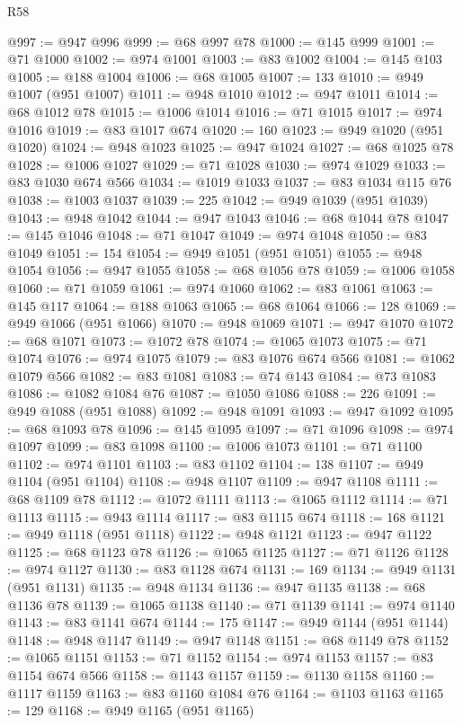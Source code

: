 \begin{lexlean}{R58}
\begin{coremodule}
{{@997 := @947 @996
@999 := @68 @997 @78
@1000 := @145 @999
@1001 := @71 @1000
@1002 := @974 @1001
@1003 := @83 @1002
@1004 := @145 @103
@1005 := @188 @1004
@1006 := @68 @1005
@1007 := 133
@1010 := @949 @1007 (@951 @1007)
@1011 := @948 @1010
@1012 := @947 @1011
@1014 := @68 @1012 @78
@1015 := @1006 @1014
@1016 := @71 @1015
@1017 := @974 @1016
@1019 := @83 @1017 @674
@1020 := 160
@1023 := @949 @1020 (@951 @1020)
@1024 := @948 @1023
@1025 := @947 @1024
@1027 := @68 @1025 @78
@1028 := @1006 @1027
@1029 := @71 @1028
@1030 := @974 @1029
@1033 := @83 @1030 @674 @566
@1034 := @1019 @1033
@1037 := @83 @1034 @115 @76
@1038 := @1003 @1037
@1039 := 225
@1042 := @949 @1039 (@951 @1039)
@1043 := @948 @1042
@1044 := @947 @1043
@1046 := @68 @1044 @78
@1047 := @145 @1046
@1048 := @71 @1047
@1049 := @974 @1048
@1050 := @83 @1049
@1051 := 154
@1054 := @949 @1051 (@951 @1051)
@1055 := @948 @1054
@1056 := @947 @1055
@1058 := @68 @1056 @78
@1059 := @1006 @1058
@1060 := @71 @1059
@1061 := @974 @1060
@1062 := @83 @1061
@1063 := @145 @117
@1064 := @188 @1063
@1065 := @68 @1064
@1066 := 128
@1069 := @949 @1066 (@951 @1066)
@1070 := @948 @1069
@1071 := @947 @1070
@1072 := @68 @1071
@1073 := @1072 @78
@1074 := @1065 @1073
@1075 := @71 @1074
@1076 := @974 @1075
@1079 := @83 @1076 @674 @566
@1081 := @1062 @1079 @566
@1082 := @83 @1081
@1083 := @74 @143
@1084 := @73 @1083
@1086 := @1082 @1084 @76
@1087 := @1050 @1086
@1088 := 226
@1091 := @949 @1088 (@951 @1088)
@1092 := @948 @1091
@1093 := @947 @1092
@1095 := @68 @1093 @78
@1096 := @145 @1095
@1097 := @71 @1096
@1098 := @974 @1097
@1099 := @83 @1098
@1100 := @1006 @1073
@1101 := @71 @1100
@1102 := @974 @1101
@1103 := @83 @1102
@1104 := 138
@1107 := @949 @1104 (@951 @1104)
@1108 := @948 @1107
@1109 := @947 @1108
@1111 := @68 @1109 @78
@1112 := @1072 @1111
@1113 := @1065 @1112
@1114 := @71 @1113
@1115 := @943 @1114
@1117 := @83 @1115 @674
@1118 := 168
@1121 := @949 @1118 (@951 @1118)
@1122 := @948 @1121
@1123 := @947 @1122
@1125 := @68 @1123 @78
@1126 := @1065 @1125
@1127 := @71 @1126
@1128 := @974 @1127
@1130 := @83 @1128 @674
@1131 := 169
@1134 := @949 @1131 (@951 @1131)
@1135 := @948 @1134
@1136 := @947 @1135
@1138 := @68 @1136 @78
@1139 := @1065 @1138
@1140 := @71 @1139
@1141 := @974 @1140
@1143 := @83 @1141 @674
@1144 := 175
@1147 := @949 @1144 (@951 @1144)
@1148 := @948 @1147
@1149 := @947 @1148
@1151 := @68 @1149 @78
@1152 := @1065 @1151
@1153 := @71 @1152
@1154 := @974 @1153
@1157 := @83 @1154 @674 @566
@1158 := @1143 @1157
@1159 := @1130 @1158
@1160 := @1117 @1159
@1163 := @83 @1160 @1084 @76
@1164 := @1103 @1163
@1165 := 129
@1168 := @949 @1165 (@951 @1165)
}}
\end{coremodule}
\end{lexlean}
